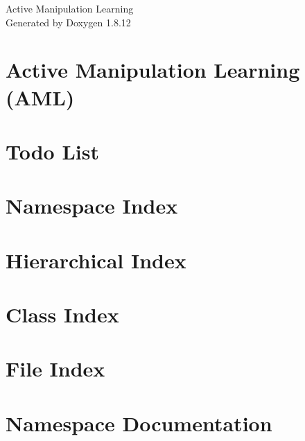 \documentclass[twoside]{book}
\newcommand{\+}{\discretionary{\mbox{\scriptsize$\hookleftarrow$}}{}{}}
\newcommand{\clearemptydoublepage}{%
  \newpage{\pagestyle{empty}\cleardoublepage}%
}
\begin{document}
\hypersetup{pageanchor=false,
             bookmarksnumbered=true,
             pdfencoding=unicode
            }
\begin{titlepage}
\vspace*{7cm}
\begin{center}%
{\Large Active Manipulation Learning }\\
\vspace*{1cm}
{\large Generated by Doxygen 1.8.12}\\
\end{center}
\end{titlepage}
\clearemptydoublepage
{}
\tableofcontents
\clearemptydoublepage
{}
\hypersetup{pageanchor=true}

\chapter{Active Manipulation Learning (A\+ML)}
\label{md__r_e_a_d_m_e}
\hypertarget{md__r_e_a_d_m_e}{}

\chapter{Todo List}
\label{todo}
\hypertarget{todo}{}

\chapter{Namespace Index}

\chapter{Hierarchical Index}

\chapter{Class Index}

\chapter{File Index}

\chapter{Namespace Documentation}

\end{document}
